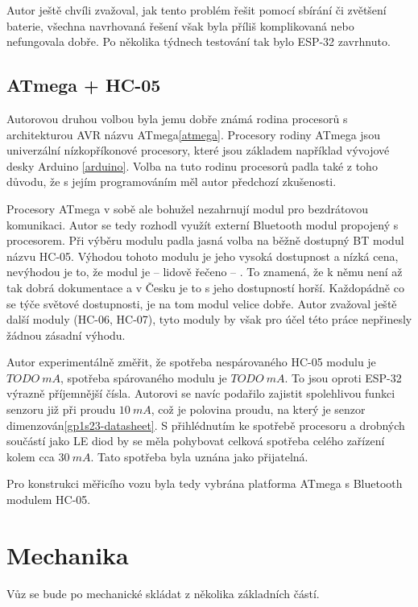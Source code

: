 Autor ještě chvíli zvažoval, jak tento problém řešit pomocí sbírání či zvětšení
baterie, všechna navrhovaná řešení však byla příliš komplikovaná nebo
nefungovala dobře. Po několika týdnech testování tak bylo ESP-32 zavrhnuto.

\subsection{ATmega + HC-05}

Autorovou druhou volbou byla jemu dobře známá rodina procesorů s architekturou
AVR názvu ATmega\ref{atmega}. Procesory rodiny ATmega jsou univerzální
nízkopříkonové procesory, které jsou základem například vývojové desky Arduino
\ref{arduino}. Volba na tuto rodinu procesorů padla také z toho důvodu, že
s jejím programováním měl autor předchozí zkušenosti.

Procesory ATmega v sobě ale bohužel nezahrnují modul pro bezdrátovou komunikaci.
Autor se tedy rozhodl využít externí Bluetooth modul propojený s procesorem.
Při výběru modulu padla jasná volba na běžně dostupný BT modul názvu HC-05.
Výhodou tohoto modulu je jeho vysoká dostupnost a nízká cena, nevýhodou je to,
že modul je -- lidově řečeno -- . To znamená, že k němu není až
tak dobrá dokumentace a v Česku je to s jeho dostupností horší. Každopádně
co se týče světové dostupnosti, je na tom modul velice dobře. Autor zvažoval
ještě další moduly (HC-06, HC-07), tyto moduly by však pro účel této práce
nepřinesly žádnou zásadní výhodu.

Autor experimentálně změřit, že spotřeba nespárovaného HC-05 modulu je
$TODO\ mA$, spotřeba spárovaného modulu je $TODO\ mA$. To jsou oproti ESP-32
výrazně příjemnější čísla. Autorovi se navíc podařilo zajistit spolehlivou
funkci senzoru již při proudu $10\ mA$, což je polovina proudu, na který
je senzor dimenzován\ref{gp1s23-datasheet}. S přihlédnutím ke spotřebě procesoru
a drobných součástí jako LE diod by se měla pohybovat celková spotřeba celého
zařízení kolem cca $30\ mA$. Tato spotřeba byla uznána jako přijatelná.

Pro konstrukci měřicího vozu byla tedy vybrána platforma ATmega s Bluetooth
modulem HC-05.

\section{Mechanika}

Vůz se bude po mechanické skládat z několika základních částí.

